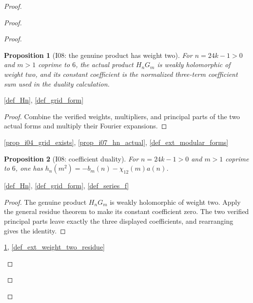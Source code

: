 \documentclass[11pt,a4paper]{article}
\numberwithin{equation}{section}
\theoremstyle{plain}\newtheorem{theorem}{Theorem}[section]\newaliascnt{proposition}{theorem}\newtheorem{proposition}[proposition]{Proposition}\aliascntresetthe{proposition}\newaliascnt{lemma}{theorem}\newtheorem{lemma}[lemma]{Lemma}\aliascntresetthe{lemma}
\theoremstyle{definition}\newaliascnt{definition}{theorem}\newtheorem{definition}[definition]{Definition}\aliascntresetthe{definition}\newaliascnt{notation}{theorem}\newtheorem{notation}[notation]{Notation}\aliascntresetthe{notation}
\providecommand{\lean}[1]{}\providecommand{\leanok}{}
\begin{document}
\begin{proof}
\begin{proof}
\begin{proof}
\begin{proposition}[I08: the genuine product has weight two]\label{prop_i08_product_weight_two}\lean{SptCM.Analytic.Repaired.actual_product_weight_two}\leanok
For $n=24k-1>0$ and $m>1$ coprime to $6$, the actual product $H_nG_m$ is weakly holomorphic of weight two, and its constant coefficient is the normalized three-term coefficient sum used in the duality calculation.
\end{proposition}
\begin{uses-statement}\ref{def_Hn}, \ref{def_grid_form}\end{uses-statement}
\begin{proof}Combine the verified weights, multipliers, and principal parts of the two actual forms and multiply their Fourier expansions.\end{proof}
\begin{uses-proof}\ref{prop_i04_grid_exists}, \ref{prop_i07_hn_actual}, \ref{def_ext_modular_forms}\end{uses-proof}

\begin{proposition}[I08: coefficient duality]\label{prop_i08_coefficient_duality}\lean{SptCM.Analytic.Repaired.actual_coefficient_duality}\leanok
For $n=24k-1>0$ and $m>1$ coprime to $6$, one has $h_n(m^2)=-b_m(n)-\chi_{12}(m)a(n)$.
\end{proposition}
\begin{uses-statement}\ref{def_Hn}, \ref{def_grid_form}, \ref{def_series_f}\end{uses-statement}
\begin{proof}
The genuine product $H_nG_m$ is weakly holomorphic of weight two.  Apply the general residue theorem to make its constant coefficient zero.  The two verified principal parts leave exactly the three displayed coefficients, and rearranging gives the identity.
\end{proof}
\begin{uses-proof}\ref{prop_i08_product_weight_two}, \ref{def_ext_weight_two_residue}\end{uses-proof}


\end{proof}
\end{proof}
\end{proof}
\end{document}
